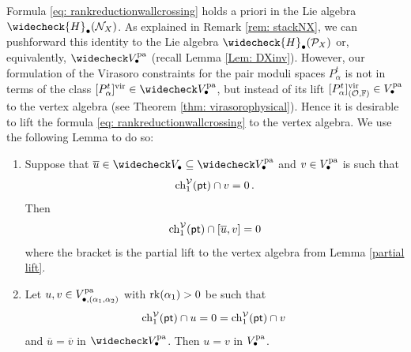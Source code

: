 \documentclass[a4paper, 12pt]{amsart}
\begin{document}
Formula \eqref{eq: rankreductionwallcrossing} holds a priori in the Lie algebra $\widecheck{H}_\bullet(\CN_X)$. As explained in Remark \ref{rem: stackNX}, we can pushforward this identity to the Lie algebra $\widecheck{H}_\bullet(\CP_X)$ or, equivalently, $\widecheck V_\bullet^{\pa}$ (recall Lemma \ref{Lem: DXinv}). However, our formulation of the Virasoro constraints for the pair moduli spaces $P_\alpha^t$ is not in terms of the class $[P_\alpha^t]^\vir\in \widecheck V_\bullet^{\pa}$, but instead of its lift $[P_\alpha^t]^{\mathrm{vir}}_{({\mathcal O},{\mathbb{F}})}\in V_\bullet^{\mathop{\rm pa}\nolimits}$ to the vertex algebra (see Theorem \ref{thm: virasorophysical}). Hence it is desirable to lift the formula \eqref{eq: rankreductionwallcrossing} to the vertex algebra. We use the following Lemma to do so: 

\begin{lemma}\label{lem: liftvertexalgebra}
\begin{enumerate}
\item[a)]
Suppose that $\overline{u}\in \widecheck V_\bullet\subseteq \widecheck V_\bullet^{\pa}$ and $v\in V_\bullet^{\mathop{\rm pa}\nolimits}$ is such that \[\mathrm{ch}_1^{\mathcal V}({\mathsf{pt}})\cap v=0\,.\] Then
\[\mathrm{ch}_1^{\mathcal V}({\mathsf{pt}})\cap [\overline u, v]=0\]
where the bracket is the partial lift to the vertex algebra from Lemma \ref{partial lift}.
\item[b)] Let $u,v\in V_{\bullet, (\alpha_1, \alpha_2)}^{\mathop{\rm pa}\nolimits}$ with $\mathrm{rk}(\alpha_1)>0$ be such that 
\[\mathrm{ch}_1^{\mathcal V}({\mathsf{pt}})\cap u=0=\mathrm{ch}_1^{\mathcal V}({\mathsf{pt}})\cap v\,\]
and $\overline u=\overline v$ in $\widecheck V_\bullet^{\pa}$. Then $u=v$ in $V_\bullet^{\mathop{\rm pa}\nolimits}$. 
\end{enumerate}
\end{lemma}
\end{document}
